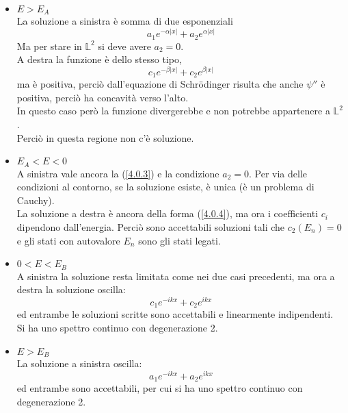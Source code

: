 \documentclass[twoside]{article}
\begin{document}
\begin{itemize}
    \item \underline{$E>E_A$}
    \\
    La soluzione a sinistra è somma di due esponenziali
    \begin{equation} \label{4.0.3}
        a_1 e^{-\alpha |x|}+a_2 e^{\alpha |x|}
    \end{equation}
    Ma per stare in $\mathds{L}^2$ si deve avere $a_2=0$.
    \\
    A destra la funzione è dello stesso tipo,
    \begin{equation} \label{4.0.4}
        c_1 e^{-\beta |x|}+c_2 e^{\beta |x|}
    \end{equation}
    ma è positiva, perciò dall'equazione di Schr\"odinger risulta che anche $\psi''$ è positiva, perciò ha concavità verso l'alto.
    \\
    In questo caso però la funzione divergerebbe e non potrebbe appartenere a $\mathds{L}^2$.
    \\
    Perciò in questa regione non c'è soluzione.
    \item \underline{$E_A<E<0$}
    \\
    A sinistra vale ancora la (\ref{4.0.3}) e la condizione $a_2=0$.
    Per via delle condizioni al contorno, se la soluzione esiste, è unica (è un problema di Cauchy).
    \\
    La soluzione a destra è ancora della forma (\ref{4.0.4}), ma ora i coefficienti $c_i$ dipendono dall'energia. Perciò sono accettabili soluzioni tali che $c_2(E_n)=0$ e gli stati con autovalore $E_n$ sono gli stati legati.
    \item \underline{$0<E<E_B$}
    \\
    A sinistra la soluzione resta limitata come nei due casi precedenti, ma ora a destra la soluzione oscilla:
    \begin{equation}
        c_1e^{-ikx}+c_2e^{ikx}
    \end{equation}
    ed entrambe le soluzioni scritte sono accettabili e linearmente indipendenti.
    \\
    Si ha uno spettro continuo con degenerazione 2.
    \item \underline{$E>E_B$}
    \\
    La soluzione a sinistra oscilla:
    \begin{equation}
        a_1e^{-ikx}+a_2e^{ikx}
    \end{equation}
    ed entrambe sono accettabili, per cui si ha uno spettro continuo con degenerazione 2.
\end{itemize}
\end{document}
